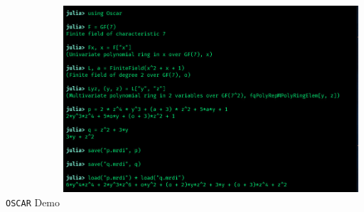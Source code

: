 \documentclass[9pt]{beamer}
\newcommand\oscar{\texttt{OSCAR}\xspace}
\theoremstyle{definition}
\begin{document}
\begin{frame}[fragile]{\oscar Demo}
  \includegraphics[height=8cm, width=11cm]{images/demo}
\end{frame}
  

\end{document}
